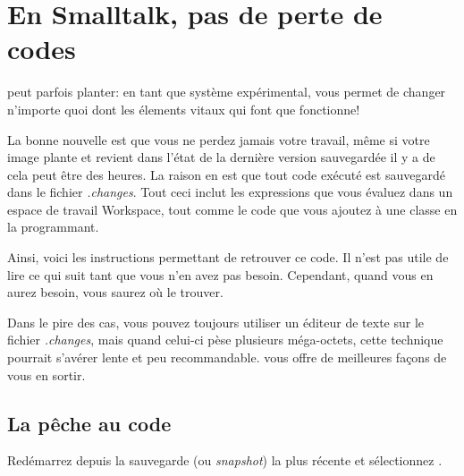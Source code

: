 \documentclass[a4paper,10pt,twoside]{book}
\begin{document}
\section{En Smalltalk, pas de perte de codes}

\pharo peut parfois planter: en tant que système expérimental, \pharo vous permet
de changer n'importe quoi dont les élements vitaux qui font que \pharo fonctionne!


La bonne nouvelle est que vous ne perdez jamais votre travail, même si votre 
image plante et revient dans l'état de la dernière version sauvegardée il y 
a de cela peut être des heures.
La raison en est que tout code exécuté est sauvegardé dans le fichier
\emph{.changes}.
Tout ceci inclut les expressions que vous évaluez dans un espace de travail Workspace,
tout comme le code que vous ajoutez à une classe en la programmant.

Ainsi, voici les instructions permettant de retrouver ce code.
Il n'est pas utile de lire ce qui suit tant que vous n'en avez pas besoin.
Cependant, quand vous en aurez besoin, vous saurez où le trouver.

Dans le pire des cas, vous pouvez toujours utiliser un éditeur de texte
sur le fichier \emph{.changes}, mais quand celui-ci pèse plusieurs méga-octets,
cette technique pourrait s'avérer lente et peu recommandable.
\pharo vous offre de meilleures façons de vous en sortir.

\subsection{La pêche au code}

Redémarrez \pharo depuis la sauvegarde (ou \emph{snapshot}) la plus récente et
sélectionnez . 

\end{document}
